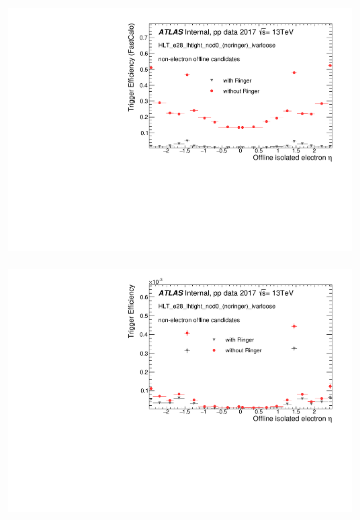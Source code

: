 \begin{figure}[h!tb]
\begin{subfigure}[c]{.49\textwidth}
  \caption{}
  \end{subfigure}\\
  \begin{subfigure}[c]{.49\textwidth}
  \centering
  \includegraphics[width=\textwidth]{sections/03_operation/figures/efficiencies/eff_EGAM7_e28_ringer_and_noringer_2017_after_ts1_L2Calo_eta.pdf}
  \caption{}
  \end{subfigure}
  \begin{subfigure}[c]{.49\textwidth}
  \centering
  \includegraphics[width=\textwidth]{sections/03_operation/figures/efficiencies/eff_EGAM7_e28_ringer_and_noringer_2017_after_ts1_eta.pdf}
  \caption{}
  \end{subfigure}\\
  \begin{subfigure}[c]{.49\textwidth}

\end{subfigure}
\end{figure}
